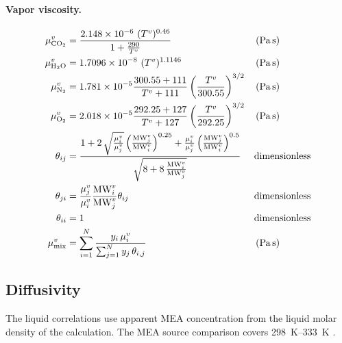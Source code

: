 \paragraph{Vapor viscosity.}
\begin{align}
\mu ^{\vap}_{\COtwo} &= \frac{2.148 \times 10^{-6} \ (T^{\vap})^{0.46}}{1+\frac{290}{T^{\vap}}}
&& \left(\unit{Pa\,s}\right)\\
\mu ^{\vap}_{\HtwoO} &= 1.7096\times 10^{-8} \ (T^{\vap})^{1.1146}
&& \left(\unit{Pa\,s}\right)\\
\mu ^{\vap}_{\Ntwo} &= 1.781\times10^{-5}\frac{300.55+111}{T^{\vap}+111}\left(\frac{T^{\vap}}{300.55}\right)^{3/2}
&& \left(\unit{Pa\,s}\right)\\
\mu ^{\vap}_{\Otwo} &= 2.018\times10^{-5}\frac{292.25+127}{T^{\vap}+127}\left(\frac{T^{\vap}}{292.25}\right)^{3/2}
&& \left(\unit{Pa\,s}\right)\\
\theta_{ij} &= \frac{1 + 2\,\sqrt{\frac{\mu^{\vap}_{i}}{\mu^{\vap}_{j}}}\left(\frac{\text{MW}^{\vap}_{j}}{\text{MW}^{\vap}_{i}}\right)^{0.25} + \frac{\mu^{\vap}_{i}}{\mu^{\vap}_{j}}\left(\frac{\text{MW}^{\vap}_{j}}{\text{MW}^{\vap}_{i}}\right)^{0.5}}{\sqrt{8 + 8\,\frac{\text{MW}^{\vap}_{i}}{\text{MW}^{\vap}_{j}}}}
&& \text{dimensionless}\\
\theta_{ji} &= \frac{\mu ^{\vap}_{j}}{\mu ^{\vap}_{i}}\frac{\text{MW}^{\vap}_{i}}{\text{MW}^{\vap}_{j}}\theta_{ij}
&& \text{dimensionless}\\
\theta_{ii} &= 1
&& \text{dimensionless}\\
\mu^{\vap}_{\text{mix}} &= \sum_{i=1}^{N} \frac{y_i \,\mu^{\vap}_{i}}{\sum_{j=1}^{N} y_j \,\theta_{i,j}}
&& \left(\unit{Pa\,s}\right)
\end{align}

\subsection{Diffusivity}
The liquid correlations use apparent MEA concentration from the liquid molar density of the calculation.
The MEA source comparison covers \qtyrange{298}{333}{K} \cite{snijderDiffusionCoefficientsSeveral1993,Luo2015}.
